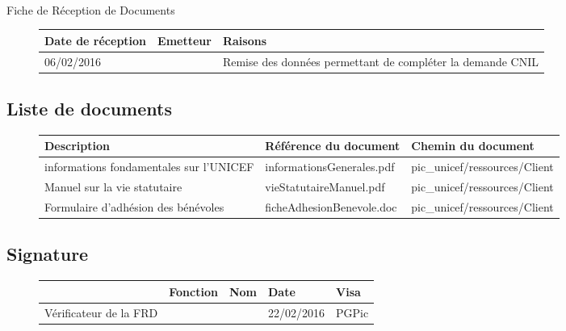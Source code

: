 \documentclass[asi, sansVersion]{picInsa}
\begin{document}
\begin{center}
\huge
\nomEquipe{}\\
Fiche de Réception de Documents\\
\end{center}
\vspace{0.5cm}


\begin{figure}[H]
		\centering
		\begin{tabularx}{17cm}{|X|X|X|}
		\hline
		\rowcolor[gray]{0.85}Date de réception & Emetteur & Raisons \\
		\hline
		06/02/2016 & \nomClient{} & Remise des données permettant de compléter la demande CNIL\\
		\hline
		\end{tabularx}
\end{figure}

\subsection*{Liste de documents}

\begin{figure}[H]
		\centering
		\begin{tabularx}{17cm}{|X|X|X|}
		\hline
		\rowcolor[gray]{0.85} Description & Référence du document & Chemin du document \\
		\hline		
		informations fondamentales sur l'UNICEF & informationsGenerales.pdf & pic\_unicef/ressources/Client \\
		\hline
		Manuel sur la vie statutaire & vieStatutaireManuel.pdf & pic\_unicef/ressources/Client\\
		\hline
		Formulaire d'adhésion des bénévoles & ficheAdhesionBenevole.doc & pic\_unicef/ressources/Client\\
		\hline
		\end{tabularx}
\end{figure}

\subsection*{Signature}

\begin{figure}[H]
		\centering
		\begin{tabularx}{17cm}{|p{4cm}|X|X|X|X|}
		\hline
		\rowcolor[gray]{0.85}& Fonction & Nom & Date & Visa \\
		\hline
		 Vérificateur de la FRD & \RGC & \Mathieu & 22/02/2016 & PGPic \\
		\hline
		\end{tabularx}
\end{figure}
\end{document}
